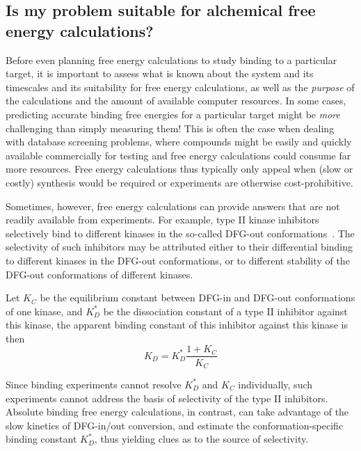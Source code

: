 \documentclass[9pt,bestpractices]{livecoms}
\begin{document}
\subsection{Is my problem suitable for alchemical free energy calculations?}
\label{subsec:suitability}
Before even planning free energy calculations to study binding to a
particular target, it is important to assess what is known about the
system and its timescales and its suitability for free energy
calculations, as well as the \emph{purpose} of the calculations and
the amount of available computer resources. In some cases, predicting accurate binding free energies for a particular target might be
\emph{more} challenging than simply measuring them! This is
often the case when dealing with database screening problems, where
compounds might be easily and quickly available commercially for
testing and free energy calculations could consume far more resources. Free energy calculations thus typically only
appeal when (slow or costly) synthesis would be required or experiments are otherwise cost-prohibitive.

Sometimes, however, free energy calculations can provide answers that are not
readily available from experiments. For example, type II kinase
inhibitors selectively bind to different kinases in the so-called
DFG-out conformations~\cite{schindler2000structural}. The selectivity of such
inhibitors may be attributed either to their differential binding to
different kinases in the DFG-out conformations, or to different
stability of the DFG-out conformations of different kinases. 

Let
$K_C$ be the equilibrium constant between DFG-in and DFG-out
conformations of one kinase, and $K_D^\ast$ be the dissociation
constant of a type II inhibitor against this kinase, the apparent
binding constant of this inhibitor against this kinase is then
\begin{equation}
  K_D = K_D^\ast \frac{1 + K_C}{K_C}
  \label{eqn:conformational-binding}
\end{equation}

Since binding experiments cannot resolve $K_D^\ast$ and $K_C$ individually, such experiments cannot address the basis of selectivity of the type II inhibitors. Absolute binding free energy calculations, in contrast, can take advantage of the slow kinetics of DFG-in/out conversion, and estimate the conformation-specific binding constant $K_D^\ast$, thus yielding clues as to the source of selectivity.

%
%
\end{document}

